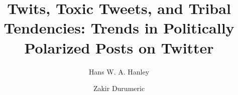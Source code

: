\documentclass[nonacm,acmsmall,screen,letterpaper]{acmart}
\begin{document}
\title[Twits, Toxic Tweets, and Tribal Tendencies]{Twits, Toxic Tweets, and Tribal Tendencies: Trends in Politically Polarized Posts on Twitter}

\author{Hans W. A. Hanley}


\author{Zakir Durumeric}


\end{document}
